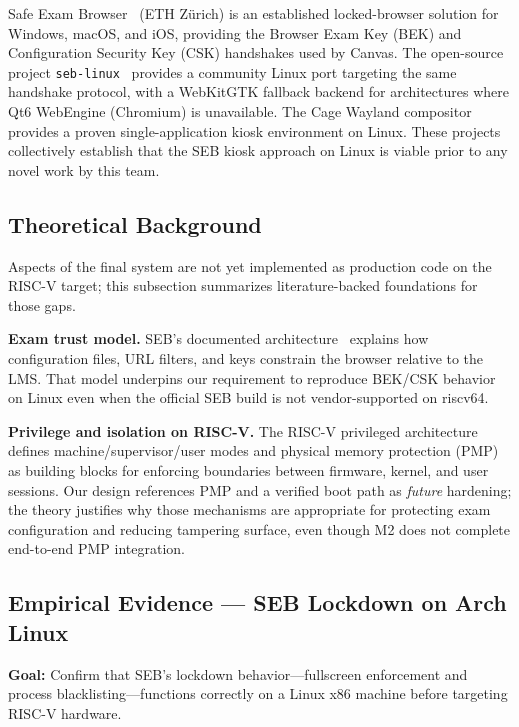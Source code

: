 \documentclass[11pt]{article}
\begin{document}
Safe Exam Browser~\cite{safeexambrowser} (ETH Z\"{u}rich) is an established locked-browser solution for Windows, macOS, and iOS, providing the Browser Exam Key (BEK) and Configuration Security Key (CSK) handshakes used by Canvas. The open-source project \texttt{seb-linux}~\cite{seblinux} provides a community Linux port targeting the same handshake protocol, with a WebKitGTK fallback backend for architectures where Qt6 WebEngine (Chromium) is unavailable. The Cage Wayland compositor~\cite{cage_kiosk} provides a proven single-application kiosk environment on Linux. These projects collectively establish that the SEB kiosk approach on Linux is viable prior to any novel work by this team.

\subsection{Theoretical Background}

Aspects of the final system are not yet implemented as production code on the RISC-V target; this subsection summarizes literature-backed foundations for those gaps.

\textbf{Exam trust model.} SEB's documented architecture~\cite{seb_concept} explains how configuration files, URL filters, and keys constrain the browser relative to the LMS. That model underpins our requirement to reproduce BEK/CSK behavior on Linux even when the official SEB build is not vendor-supported on riscv64.

\textbf{Privilege and isolation on RISC-V.} The RISC-V privileged architecture~\cite{riscv_priv} defines machine/supervisor/user modes and physical memory protection (PMP) as building blocks for enforcing boundaries between firmware, kernel, and user sessions. Our design references PMP and a verified boot path as \emph{future} hardening; the theory justifies why those mechanisms are appropriate for protecting exam configuration and reducing tampering surface, even though M2 does not complete end-to-end PMP integration.

\subsection{Empirical Evidence --- SEB Lockdown on Arch Linux}
\label{sec:empirical-arch}

\textbf{Goal:} Confirm that SEB's lockdown behavior---fullscreen enforcement and process blacklisting---functions correctly on a Linux x86 machine before targeting RISC-V hardware.
\end{document}
